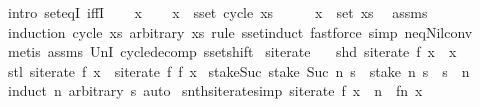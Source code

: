 \begin{isabellebody}
%
\isadelimproof
%
\endisadelimproof
%
\isatagproof
{}\isamarkupfalse%
\ {\isacharparenleft}intro\ set{\isacharunderscore}eqI\ iffI{\isacharparenright}\isanewline
\ \ \isamarkupfalse%
\ x\isanewline
\ \ \isamarkupfalse%
\ {\isachardoublequoteopen}x\ {\isasymin}\ sset\ {\isacharparenleft}cycle\ xs{\isacharparenright}{\isachardoublequoteclose}\isanewline
\ \ \isamarkupfalse%
\ \isamarkupfalse%
\ {\isachardoublequoteopen}x\ {\isasymin}\ set\ xs{\isachardoublequoteclose}\ \isamarkupfalse%
\ assms\isanewline
\ \ \ \ \isamarkupfalse%
\ {\isacharparenleft}induction\ {\isachardoublequoteopen}cycle\ xs{\isachardoublequoteclose}\ arbitrary{\isacharcolon}\ xs\ rule{\isacharcolon}\ sset{\isacharunderscore}induct{\isacharparenright}\ {\isacharparenleft}fastforce\ simp{\isacharcolon}\ neq{\isacharunderscore}Nil{\isacharunderscore}conv{\isacharparenright}{\isacharplus}\isanewline
{}\isamarkupfalse%
\ {\isacharparenleft}metis\ assms\ UnI{}\ cycle{\isacharunderscore}decomp\ sset{\isacharunderscore}shift{\isacharparenright}%
\endisatagproof
{\isafoldproof}%
%
\isadelimproof
%
\endisadelimproof
%
\isadelimdocument
%
\endisadelimdocument
%
\isatagdocument
%
\isamarkuptrue%
%
\endisatagdocument
{\isafolddocument}%
%
\isadelimdocument
%
\endisadelimdocument
{}\isamarkupfalse%
\ siterate\ \isanewline
\ \ {\isachardoublequoteopen}shd\ {\isacharparenleft}siterate\ f\ x{\isacharparenright}\ {\isacharequal}\ x{\isachardoublequoteclose}\isanewline
{\isacharbar}\ {\isachardoublequoteopen}stl\ {\isacharparenleft}siterate\ f\ x{\isacharparenright}\ {\isacharequal}\ siterate\ f\ {\isacharparenleft}f\ x{\isacharparenright}{\isachardoublequoteclose}\isanewline
\isanewline
{}\isamarkupfalse%
\ stake{\isacharunderscore}Suc{\isacharcolon}\ {\isachardoublequoteopen}stake\ {\isacharparenleft}Suc\ n{\isacharparenright}\ s\ {\isacharequal}\ stake\ n\ s\ {\isacharat}\ {\isacharbrackleft}s\ {\isacharbang}{\isacharbang}\ n{\isacharbrackright}{\isachardoublequoteclose}\isanewline
%
\isadelimproof
\ \ %
\endisadelimproof
%
\isatagproof
{}\isamarkupfalse%
\ {\isacharparenleft}induct\ n\ arbitrary{\isacharcolon}\ s{\isacharparenright}\ auto%
\endisatagproof
{\isafoldproof}%
%
\isadelimproof
\isanewline
%
\endisadelimproof
\isanewline
{}\isamarkupfalse%
\ snth{\isacharunderscore}siterate{\isacharbrackleft}simp{\isacharbrackright}{\isacharcolon}\ {\isachardoublequoteopen}siterate\ f\ x\ {\isacharbang}{\isacharbang}\ n\ {\isacharequal}\ {\isacharparenleft}f{\isacharcircum}{\isacharcircum}n{\isacharparenright}\ x{\isachardoublequoteclose}\isanewline

\end{isabellebody}
